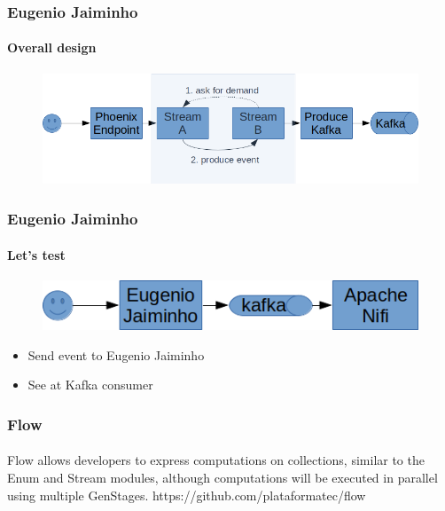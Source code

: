 \documentclass{beamer}
\begin{document}
  
  \begin{frame}
    \frametitle{Eugenio Jaiminho}
    \framesubtitle{Overall design}

     \begin{figure}[t]
     \includegraphics[scale=0.5]{img/design.png}
     \centering
     \end{figure}
     
  \end{frame}


  \begin{frame}
    \frametitle{Eugenio Jaiminho}
    \framesubtitle{Let's test}

     \begin{figure}[t]
     \includegraphics[scale=0.5]{img/test1.png}
     \centering
     \end{figure}
     
     \begin{itemize}
       \item Send event to Eugenio Jaiminho
       \item See at Kafka consumer
     \end{itemize}
     
  \end{frame}

  \begin{frame}
    \frametitle{Flow}
    \framesubtitle{}

    \begin{block}{}
    Flow allows developers to express computations on collections, similar to the Enum and Stream modules, although computations will be executed in parallel using multiple GenStages. https://github.com/plataformatec/flow
    \end{block}
    
  \end{frame}
\end{document}
